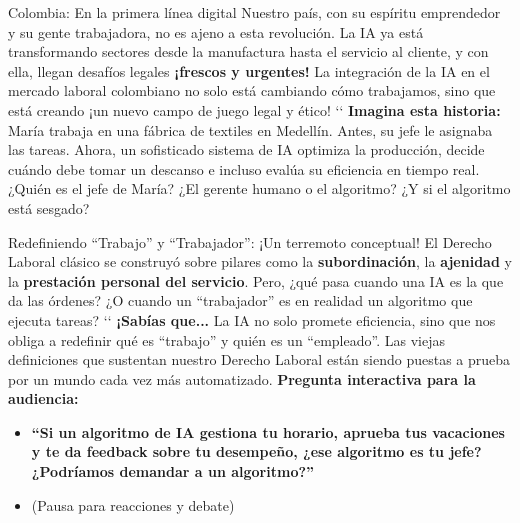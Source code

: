 \documentclass[aspectratio=169]{beamer}
\begin{document}
\begin{frame}{Colombia: En la primera línea digital}
Nuestro país, con su espíritu emprendedor y su gente trabajadora, no es ajeno a esta revolución. La IA ya está transformando sectores desde la manufactura hasta el servicio al cliente, y con ella, llegan desafíos legales \textbf{¡frescos y urgentes!}
La integración de la IA en el mercado laboral colombiano no solo está cambiando cómo trabajamos, sino que está creando ¡un nuevo campo de juego legal y ético! `\cite{Eljach Mendoza, C. (2024)}`
\textbf{Imagina esta historia:}
María trabaja en una fábrica de textiles en Medellín. Antes, su jefe le asignaba las tareas. Ahora, un sofisticado sistema de IA optimiza la producción, decide cuándo debe tomar un descanso e incluso evalúa su eficiencia en tiempo real. ¿Quién es el jefe de María? ¿El gerente humano o el algoritmo? ¿Y si el algoritmo está sesgado?
\end{frame}


\begin{frame}{Redefiniendo ``Trabajo'' y ``Trabajador'': ¡Un terremoto conceptual!}
El Derecho Laboral clásico se construyó sobre pilares como la \textbf{subordinación}, la \textbf{ajenidad} y la \textbf{prestación personal del servicio}. Pero, ¿qué pasa cuando una IA es la que da las órdenes? ¿O cuando un ``trabajador'' es en realidad un algoritmo que ejecuta tareas? `\cite{Otero, L. (2023)}`
\textbf{¡Sabías que...}
La IA no solo promete eficiencia, sino que nos obliga a redefinir qué es ``trabajo'' y quién es un ``empleado''. Las viejas definiciones que sustentan nuestro Derecho Laboral están siendo puestas a prueba por un mundo cada vez más automatizado.
\textbf{Pregunta interactiva para la audiencia:}
\begin{itemize}
  \item \textbf{``Si un algoritmo de IA gestiona tu horario, aprueba tus vacaciones y te da feedback sobre tu desempeño, ¿ese algoritmo es tu jefe? ¿Podríamos demandar a un algoritmo?''}
  \item (Pausa para reacciones y debate)
\end{itemize}
\end{frame}
\end{document}
